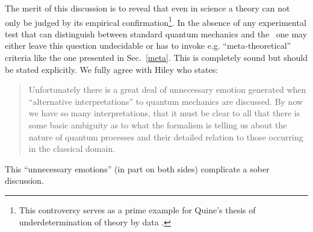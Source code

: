The merit of this discussion is to reveal that even in science a theory can not only be 
judged by its empirical confirmation\footnote{This controversy serves as a prime example for  Quine's thesis of underdetermination 
of theory by data \cite{quine}.}. In the absence of any experimental test that can 
distinguish between standard quantum mechanics and the \dbb\ one may either leave this 
question undecidable or has to invoke e.g. ``meta-theoretical'' criteria like the one presented in Sec.~\ref{meta}. 
This is completely sound but should be stated explicitly. We fully agree with Hiley who states:
\begin{quote}
Unfortunately there is a great deal of unnecessary emotion generated when
``alternative interpretations'' to quantum mechanics are discussed. By now we have so
many interpretations, that it must be clear to all that there is some basic ambiguity 
as to what the formalism is telling us about the nature of quantum processes and their 
detailed relation to those occurring in the classical domain. 
\cite{hiley}
\end{quote}
This ``unnecessary emotions'' (in part on both sides) complicate a sober discussion. 

